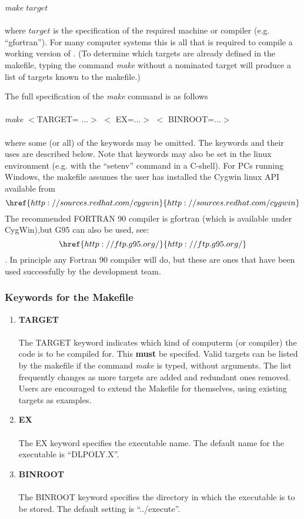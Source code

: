 {\em make} $target$\\~\\

\noindent where $target$ is the specification of the required machine
or compiler (e.g. ``gfortran''). For many computer systems this is all
that is required to compile a working version of \D{}. (To determine
which targets are already defined in the makefile, typing the command
{\em make} without a nominated target will produce a list of targets
known to the makefile.)

The full specification of the {\em make} command is as follows
\\~\\

{\em make} $<$TARGET= $\ldots >$ 
$<$ EX=$\ldots >$ $<$ BINROOT=$\ldots >$ \\~\\

\noindent where some (or all) of the keywords may be omitted.  The
keywords and their uses are described below.  Note that keywords may
also be set in the linux environment (e.g. with the ``setenv'' command
in a C-shell). For PCs running Windows, \label{PC compile} the makefile
assumes the user has installed the Cygwin linux API available from
\[\href{http://sources.redhat.com/cygwin}{http://sources.redhat.com/cygwin}\]
The recommended FORTRAN 90 compiler is gfortran (which is available
under CygWin),but G95 can also be used, see: 
\[\href{http://ftp.g95.org/}{http://ftp.g95.org/}\].
In principle any Fortran 90 compiler will do, but these are ones that
have been used successfully by the development team.

\subsubsection{Keywords for the Makefile}

\begin{enumerate}
\item {\bf TARGET}\\~\\
The TARGET keyword indicates which kind of computerm (or compiler) 
the code is to be compiled for. This {\bf must} be specifed.
Valid targets can be listed by the makefile if the command {\em make}
is typed, without arguments. The list frequently changes as more
targets are added and redundant ones removed. Users are encouraged to
extend the Makefile for themselves, using existing targets as examples.
\item {\bf EX}\\~\\
The EX keyword specifies the executable name. The default name for the
executable is ``DLPOLY.X''.
\item {\bf BINROOT}\\~\\
The BINROOT keyword specifies the directory in which the executable is
to be stored.  The default setting is ``../execute''.
\end{enumerate}

